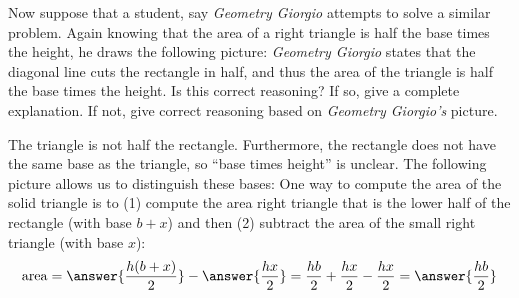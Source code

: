 \documentclass[nooutcomes]{ximera}
\begin{document}
\begin{problem}
Now suppose that a student, say \textit{Geometry Giorgio} attempts to
solve a similar problem. Again knowing that the area of a right
triangle is half the base times the height, he draws the following
picture:
\textit{Geometry Giorgio} states that the diagonal line cuts the
rectangle in half, and thus the area of the triangle is half the base
times the height. Is this correct reasoning? If so, give a complete
explanation. If not, give correct reasoning based on \textit{Geometry
  Giorgio's} picture.
\begin{freeResponse}
\begin{hint}
The triangle is not half the rectangle.  Furthermore, the rectangle does not have the same base as the triangle, so ``base times height'' is unclear.  The following picture allows us to distinguish these bases:  
One way to compute the area of the solid triangle is to (1) compute the area right triangle that is the lower half of the rectangle (with base $b+x$) and then (2) subtract the area of the small right triangle (with base $x$): 
\[
\mathrm{area} =  \answer{\frac{h(b+x)}{2}} - \answer{\frac{hx}{2}}= \frac{hb}{2} + \frac{hx}{2} - \frac{hx}{2} = \answer{\frac{hb}{2}}
\]
\end{hint}
\end{freeResponse}
\end{problem}
\end{document}
